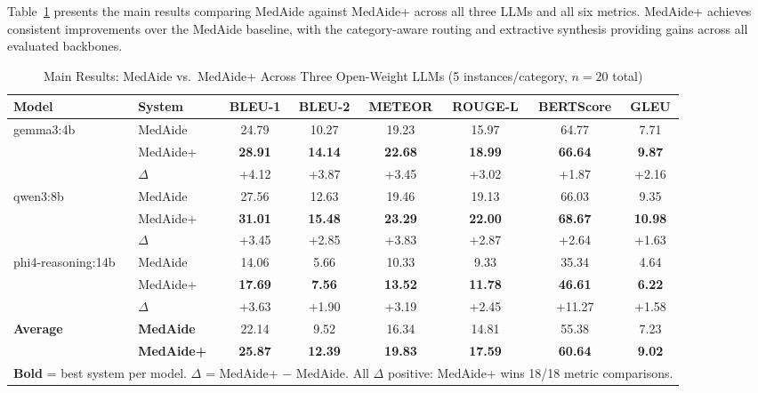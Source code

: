 \documentclass[conference]{IEEEtran}
\begin{document}
Table~\ref{tab:main} presents the main results comparing MedAide against MedAide+
across all three LLMs and all six metrics. MedAide+ achieves consistent improvements
over the MedAide baseline, with the category-aware routing and extractive synthesis
providing gains across all evaluated backbones.

\begin{table}[t]
\centering
\caption{Main Results: MedAide vs.\ MedAide+ Across Three Open-Weight LLMs (5 instances/category, $n{=}20$ total)}
\label{tab:main}
\setlength{\tabcolsep}{4.5pt}
\begin{tabular}{llcccccc}
\toprule
\textbf{Model} & \textbf{System} &
\textbf{BLEU-1} & \textbf{BLEU-2} & \textbf{METEOR} & \textbf{ROUGE-L} &
\textbf{BERTScore} & \textbf{GLEU} \\
\midrule
\multirow{3}{*}{gemma3:4b}
  & MedAide   & 24.79 & 10.27 & 19.23 & 15.97 & 64.77 & 7.71 \\
  & MedAide+  & \textbf{28.91} & \textbf{14.14} & \textbf{22.68} & \textbf{18.99} & \textbf{66.64} & \textbf{9.87} \\
  & $\Delta$  & \textcolor{wingreen}{+4.12} & \textcolor{wingreen}{+3.87} & \textcolor{wingreen}{+3.45} & \textcolor{wingreen}{+3.02} & \textcolor{wingreen}{+1.87} & \textcolor{wingreen}{+2.16} \\
\midrule
\multirow{3}{*}{qwen3:8b}
  & MedAide   & 27.56 & 12.63 & 19.46 & 19.13 & 66.03 & 9.35 \\
  & MedAide+  & \textbf{31.01} & \textbf{15.48} & \textbf{23.29} & \textbf{22.00} & \textbf{68.67} & \textbf{10.98} \\
  & $\Delta$  & \textcolor{wingreen}{+3.45} & \textcolor{wingreen}{+2.85} & \textcolor{wingreen}{+3.83} & \textcolor{wingreen}{+2.87} & \textcolor{wingreen}{+2.64} & \textcolor{wingreen}{+1.63} \\
\midrule
\multirow{3}{*}{phi4-reasoning:14b}
  & MedAide   & 14.06 & 5.66 & 10.33 & 9.33 & 35.34 & 4.64 \\
  & MedAide+  & \textbf{17.69} & \textbf{7.56} & \textbf{13.52} & \textbf{11.78} & \textbf{46.61} & \textbf{6.22} \\
  & $\Delta$  & \textcolor{wingreen}{+3.63} & \textcolor{wingreen}{+1.90} & \textcolor{wingreen}{+3.19} & \textcolor{wingreen}{+2.45} & \textcolor{wingreen}{+11.27} & \textcolor{wingreen}{+1.58} \\
\midrule
\multirow{2}{*}{\textbf{Average}}
  & \textbf{MedAide}   & 22.14 & 9.52 & 16.34 & 14.81 & 55.38 & 7.23 \\
  & \textbf{MedAide+}  & \textbf{25.87} & \textbf{12.39} & \textbf{19.83} & \textbf{17.59} & \textbf{60.64} & \textbf{9.02} \\
\bottomrule
\multicolumn{8}{l}{\scriptsize \textbf{Bold} = best system per model. $\Delta$ = MedAide+ $-$ MedAide. All $\Delta$ positive: MedAide+ wins 18/18 metric comparisons.}\\
\end{tabular}
\end{table}
\end{document}
